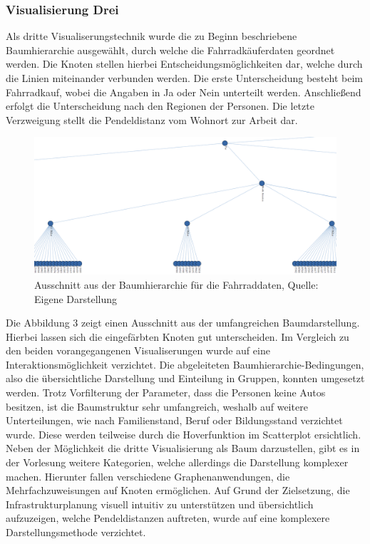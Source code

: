 \documentclass[usegeometry=true]{scrartcl}
\begin{document}
\subsubsection{Visualisierung Drei}
Als dritte Visualiserungstechnik wurde die zu Beginn beschriebene Baumhierarchie ausgewählt, durch welche die Fahrradkäuferdaten geordnet werden. Die Knoten stellen hierbei Entscheidungsmöglichkeiten dar, welche durch die Linien miteinander verbunden werden. Die erste Unterscheidung besteht beim Fahrradkauf, wobei die Angaben in Ja oder Nein unterteilt werden. Anschließend erfolgt die Unterscheidung nach den Regionen der Personen. Die letzte Verzweigung stellt die Pendeldistanz vom Wohnort zur Arbeit dar. 
\begin{figure}[h]
\begin{center}
\includegraphics[width=16cm]{Bilder/V3Baumhierarchie.png}
\caption{Ausschnitt aus der Baumhierarchie für die Fahrraddaten, Quelle: Eigene Darstellung}
\end{center}
\end{figure}
\newline
Die Abbildung 3 zeigt einen Ausschnitt aus der umfangreichen Baumdarstellung. Hierbei lassen sich die eingefärbten Knoten gut unterscheiden. Im Vergleich zu den beiden vorangegangenen Visualiserungen wurde auf eine Interaktionsmöglichkeit verzichtet. Die abgeleiteten Baumhierarchie-Bedingungen, also die übersichtliche Darstellung und Einteilung in Gruppen, konnten umgesetzt werden. Trotz Vorfilterung der Parameter, dass die Personen keine Autos besitzen, ist die Baumstruktur sehr umfangreich, weshalb auf weitere Unterteilungen, wie nach Familienstand, Beruf oder Bildungsstand verzichtet wurde. Diese werden teilweise durch die Hoverfunktion im Scatterplot ersichtlich. Neben der Möglichkeit die dritte Visualisierung als Baum darzustellen, gibt es in der Vorlesung weitere Kategorien, welche allerdings die Darstellung komplexer machen. Hierunter fallen verschiedene Graphenanwendungen, die Mehrfachzuweisungen auf Knoten ermöglichen. Auf Grund der Zielsetzung, die Infrastrukturplanung visuell intuitiv zu unterstützen und übersichtlich aufzuzeigen, welche Pendeldistanzen auftreten, wurde auf eine komplexere Darstellungsmethode verzichtet. 
\end{document}
